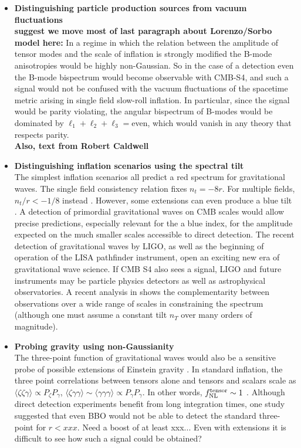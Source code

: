 \begin{itemize}
\item {\bf Distinguishing particle production sources from vacuum fluctuations}\\
{\bf suggest we move most of last paragraph about Lorenzo/Sorbo model here:}
In a regime in which the relation between the amplitude of tensor modes and the scale of inflation is strongly modified the B-mode anisotropies would be highly non-Gaussian. So in the case of a detection even the B-mode bispectrum would become observable with CMB-S4, and such a signal would not be confused with the vacuum fluctuations of the spacetime metric arising in single field slow-roll inflation. In particular, since the signal would be parity violating, the angular bispectrum of B-modes would be dominated by $\ell_1+\ell_2+\ell_3=$even, which would vanish in any theory that respects parity. \\

{\bf Also, text from Robert Caldwell}

\item {\bf Distinguishing inflation scenarios using the spectral tilt}\\
The simplest inflation scenarios all predict a red spectrum for gravitational waves. The single field consistency relation fixes $n_t=-8r$. For multiple fields, $n_t/r<-1/8$ instead \cite{Price:2014ufa}. However, some extensions can even produce a blue tilt \cite{}. A detection of primordial gravitational waves on CMB scales would allow precise predictions, especially relevant for the a blue index, for the amplitude expected on the much smaller scales accessible to direct detection. The recent detection of gravitational waves by LIGO, as well as the beginning of operation of the LISA pathfinder instrument, open an exciting new era of gravitational wave science. If CMB S4 also sees a signal, LIGO and future instruments may be particle physics detectors as well as astrophysical observatories. A recent analysis in \cite{Lasky:2015lej} shows the complementarity between observations over a wide range of scales in constraining the spectrum (although one must assume a constant tilt $n_T$ over many orders of magnitude). 

\item{\bf Probing gravity using non-Gaussianity}\\
The three-point function of gravitational waves would also be a sensitive probe of possible extensions of Einstein gravity \cite{}. In standard inflation, the three point correlations between tensors alone and tensors and scalars scale as $\langle\zeta\zeta\gamma\rangle\propto P_{\zeta}P_{\gamma}$, $\langle\zeta\gamma\gamma\rangle\sim\langle\gamma\gamma\gamma\rangle\propto P_{\gamma}P_{\gamma}$. In other words, $f^{\rm tensor}_{\rm NL}\sim 1$ \cite{}. Although direct detection experiments benefit from long integration times, one study suggested that even BBO would not be able to detect the standard three-point \cite{Adshead:2009bz} for $r<xxx$. Need a boost of at least xxx... Even with extensions it is difficult to see how such a signal could be obtained?

\end{itemize}


